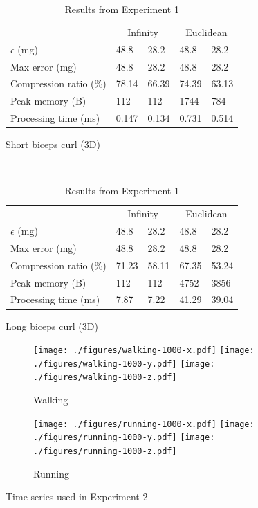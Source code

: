 \documentclass{report}
\begin{document}
\begin{table}
\begin{subfigure}{\columnwidth}
\begin{tabular}{l|l|l|l|l}
    \hline
    \rowcolor{headcolor}
                           & \multicolumn{2}{c|}{Infinity} & \multicolumn{2}{c}{Euclidean} \\
    \rowcolor{headcolor}
    $\epsilon$ (mg)        & 48.8          & 28.2          & 48.8   & 28.2   \\
    \hline
    Max error  (mg)        & 48.8          & 28.2          & 48.8   & 28.2   \\
    Compression ratio (\%) & 78.14         & 66.39         & 74.39  & 63.13   \\
    Peak memory (B)        & 112           & 112           & 1744   & 784    \\
    Processing time (ms)   & 0.147         & 0.134         & 0.731  & 0.514  \\ \hline
    \end{tabular}
    \caption{Short biceps curl (3D)}
    \end{subfigure}\\
    \begin{subfigure}{\columnwidth}
    \centering
    \begin{tabular}{l|l|l|l|l}
    \hline
    \rowcolor{headcolor}
                              & \multicolumn{2}{c|}{Infinity} & \multicolumn{2}{c}{Euclidean} \\
    \rowcolor{headcolor}
    $\epsilon$ (mg)                & 48.8        & 28.2       & 48.8     & 28.2    \\
    \hline
    Max error  (mg)                & 48.8        & 28.2       & 48.8     & 28.2    \\
    Compression ratio (\%)         & 71.23       & 58.11      & 67.35    & 53.24   \\
    Peak memory (B)                & 112         & 112        & 4752     & 3856    \\
    Processing time (ms)           & 7.87        & 7.22       & 41.29    & 39.04   \\ \hline
    \end{tabular}
    \caption{Long biceps curl (3D)}
    \end{subfigure}
    \caption{Results from Experiment 1}
    \label{table:results-validation}
\end{table}

\begin{figure}
\centering
\begin{subfigure}{1.85\columnwidth}
\centering
\texttt{[image: ./figures/walking-1000-x.pdf]}
\texttt{[image: ./figures/walking-1000-y.pdf]}
\texttt{[image: ./figures/walking-1000-z.pdf]}
\caption{Walking}
\end{subfigure}
\begin{subfigure}{1.85\columnwidth}
\centering
\texttt{[image: ./figures/running-1000-x.pdf]}
\texttt{[image: ./figures/running-1000-y.pdf]}
\texttt{[image: ./figures/running-1000-z.pdf]}
\caption{Running}
\end{subfigure}
\caption{Time series used in Experiment 2 \vspace*{-0.3cm}}
\label{fig:datasets-2}
\end{figure}
\end{document}
